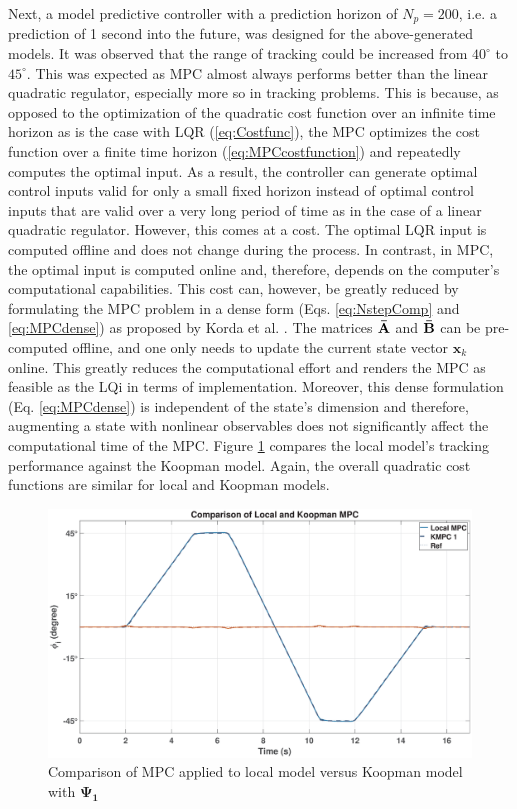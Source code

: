 Next, a model predictive controller with a prediction horizon of $N_p = 200$, i.e. a prediction of 1 second into the future, was designed for the above-generated models. It was observed that the range of tracking could be increased from $40^{\circ}$ to $45^{\circ}$. This was expected as MPC almost always performs better than the linear quadratic regulator, especially more so in tracking problems. This is because, as opposed to the optimization of the quadratic cost function over an infinite time horizon as is the case with LQR (\ref{eq:Costfunc}), the MPC optimizes the cost function over a finite time horizon (\ref{eq:MPCcostfunction}) and repeatedly computes the optimal input. As a result, the controller can generate optimal control inputs valid for only a small fixed horizon instead of optimal control inputs that are valid over a very long period of time as in the case of a linear quadratic regulator. However, this comes at a cost. The optimal LQR input is computed offline and does not change during the process. In contrast, in MPC, the optimal input is computed online and, therefore, depends on the computer's computational capabilities. This cost can, however, be greatly reduced by formulating the MPC problem in a dense form (Eqs. \ref{eq:NstepComp} and \ref{eq:MPCdense}) as proposed by Korda et al. \cite{MPC_Korda}. The matrices $\mathbf{\Bar{A}}$ and $\mathbf{\Bar{B}}$ can be pre-computed offline, and one only needs to update the current state vector $\mathbf{x}_k$ online. This greatly reduces the computational effort and renders the MPC as feasible as the LQi in terms of implementation. Moreover, this dense formulation (Eq. \ref{eq:MPCdense}) is independent of the state's dimension and therefore, augmenting a state with nonlinear observables does not significantly affect the computational time of the MPC.  Figure \ref{fig: MPC_all} compares the local model's tracking performance against the Koopman model. Again, the overall quadratic cost functions are similar for local and Koopman models.
% 
\begin{figure}[H]
    \centering
    \includegraphics[width=1\linewidth]{figures/MPC_all_5ms}
    \caption{Comparison of MPC applied to local model versus Koopman model with $\mathbf{\Psi_1}$}
    \label{fig: MPC_all}
\end{figure}
